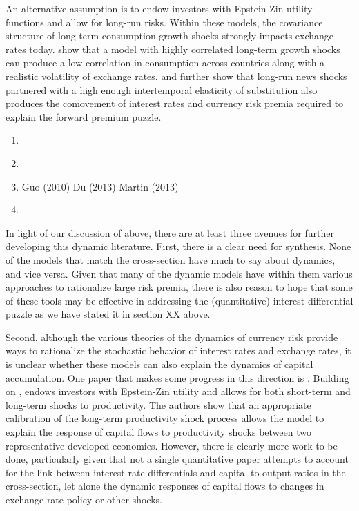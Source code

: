 \documentclass{ar-1col}
\begin{document}
An alternative assumption is to endow investors with Epstein-Zin utility functions and allow for long-run risks. Within these models, the covariance structure of long-term consumption growth shocks strongly impacts exchange rates today. \citet{ColacitoCroce2011} show that a model with highly correlated long-term growth shocks can produce a low correlation in consumption across countries along with a realistic volatility of exchange rates. \citet{BansalShaliastovich2012} and \citet{ColacitoCroce2013} further show that long-run news shocks partnered with a high enough intertemporal elasticity of substitution also produces the comovement of interest rates and currency risk premia required to explain the forward premium puzzle. 

\begin{enumerate}
    \item \citet{GourioSiemerVerdelhan2013}
    \item \citet{FarhiGabaix2016}
    \item Guo (2010) Du (2013) Martin (2013)
    \item \citet{Backusetal2001}
\end{enumerate}

In light of our discussion of above, there are at least three avenues for further developing this dynamic literature. First, there is a clear need for synthesis. None of the models that match the cross-section have much to say about dynamics, and vice versa. Given that many of the dynamic models have within them various approaches to rationalize large risk premia, there is also reason to hope that some of these tools may be effective in addressing the (quantitative) interest differential puzzle as we have stated it in section XX above. 

Second, although the various theories of the dynamics of currency risk provide ways to rationalize the stochastic behavior of interest rates and exchange rates, it is unclear whether these models can also explain the dynamics of capital accumulation. One paper that makes some progress in this direction is \citet{ColacitoCroceHoHoward2018}. Building on \citet{ColacitoCroce2011, ColacitoCroce2013}, \citet{ColacitoCroceHoHoward2018} endows investors with Epstein-Zin utility and allows for both short-term and long-term shocks to productivity. The authors show that an appropriate calibration of the long-term productivity shock process allows the model to explain
the response of capital flows to productivity shocks between two representative developed economies. However, there is clearly more work to be done, particularly given that not a single quantitative paper attempts to account for the link between interest rate differentials and capital-to-output ratios in the cross-section, let alone the dynamic responses of capital flows to changes in exchange rate policy or other shocks.
\end{document}
